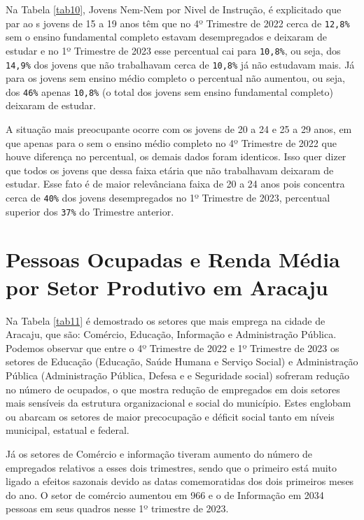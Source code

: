 \documentclass[preprint, 3p,
authoryear]{elsarticle} %
\begin{document}
Na Tabela \ref{tab10}, Jovens Nem-Nem por Nivel de Instrução, é
explicitado que par ao s jovens de 15 a 19 anos têm que no 4º Trimestre
de 2022 cerca de \texttt{12,8\%} sem o ensino fundamental completo
estavam desempregados e deixaram de estudar e no 1º Trimestre de 2023
esse percentual cai para \texttt{10,8\%}, ou seja, dos \texttt{14,9\%}
dos jovens que não trabalhavam cerca de \texttt{10,8\%} já não estudavam
mais. Já para os jovens sem ensino médio completo o percentual não
aumentou, ou seja, dos \texttt{46\%} apenas \texttt{10,8\%} (o total dos
jovens sem ensino fundamental completo) deixaram de estudar.

A situação mais preocupante ocorre com os jovens de 20 a 24 e 25 a 29
anos, em que apenas para o sem o ensino médio completo no 4º Trimestre
de 2022 que houve diferença no percentual, os demais dados foram
identicos. Isso quer dizer que todos os jovens que dessa faixa etária
que não trabalhavam deixaram de estudar. Esse fato é de maior
relevânciana faixa de 20 a 24 anos pois concentra cerca de \texttt{40\%}
dos jovens desempregados no 1º Trimestre de 2023, percentual superior
dos \texttt{37\%} do Trimestre anterior.

\hypertarget{pessoas-ocupadas-e-renda-muxe9dia-por-setor-produtivo-em-aracaju}{%
\section{Pessoas Ocupadas e Renda Média por Setor Produtivo em
Aracaju}\label{pessoas-ocupadas-e-renda-muxe9dia-por-setor-produtivo-em-aracaju}}

Na Tabela \ref{tab11} é demostrado os setores que mais emprega na cidade
de Aracaju, que são: Comércio, Educação, Informação e Administração
Pública. Podemos observar que entre o 4º Trimestre de 2022 e 1º
Trimestre de 2023 os setores de Educação (Educação, Saúde Humana e
Serviço Social) e Administração Pública (Administração Pública, Defesa e
e Seguridade social) sofreram redução no número de ocupados, o que
mostra redução de empregados em dois setores mais sensíveis da estrutura
organizacional e social do município. Estes englobam ou abarcam os
setores de maior precocupação e déficit social tanto em níveis
municipal, estatual e federal.

Já os setores de Comércio e informação tiveram aumento do número de
empregados relativos a esses dois trimestres, sendo que o primeiro está
muito ligado a efeitos sazonais devido as datas comemoratidas dos dois
primeiros meses do ano. O setor de comércio aumentou em 966 e o de
Informação em 2034 pessoas em seus quadros nesse 1º trimestre de 2023.
\end{document}

